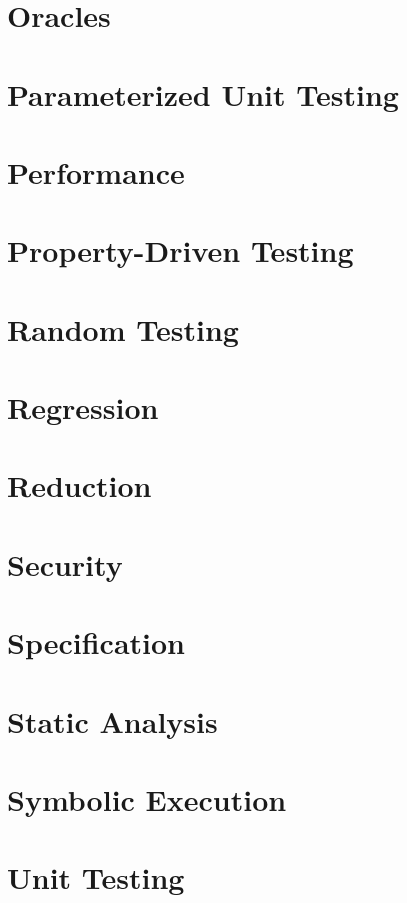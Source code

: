 \section{Oracles}

\section{Parameterized Unit Testing}

\section{Performance}

\section{Property-Driven Testing}

\section{Random Testing}

\section{Regression}

\section{Reduction}

\section{Security}

\section{Specification}

\section{Static Analysis}

\section{Symbolic Execution}

\section{Unit Testing}
